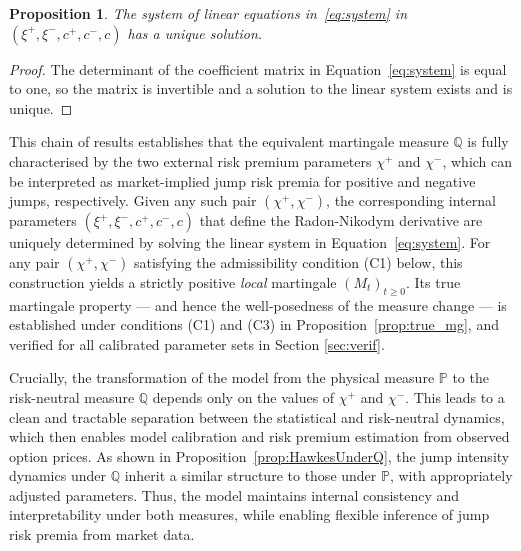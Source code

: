 \documentclass[11pt,a4paper]{article}
\numberwithin{equation}{section}
\newtheorem{proposition}[theorem]{Proposition}
\theoremstyle{remark}
\theoremstyle{definition}
\begin{document}
\begin{proposition}\label{lemma:solution}
    The system of linear equations in~\eqref{eq:system} in $(\xi^+, \xi^-, c^+, c^-, c)$ has a unique solution.
\end{proposition}
\begin{proof}
The determinant of the coefficient matrix in Equation~\eqref{eq:system} is equal to one, so the matrix is invertible and a solution to the linear system exists and is unique.
\end{proof}

This chain of results establishes that the equivalent martingale
measure $\mathbb{Q}$ is fully characterised by the two external risk
premium parameters $\chi^+$ and $\chi^-$, which can be interpreted as
market-implied jump risk premia for positive and negative jumps,
respectively. Given any such pair $(\chi^+, \chi^-)$, the
corresponding internal parameters $(\xi^+, \xi^-, c^+, c^-, c)$ that
define the Radon-Nikodym derivative are uniquely determined by solving
the linear system in Equation~\eqref{eq:system}. For any pair
  $(\chi^{+},\chi^{-})$ satisfying the
  admissibility condition (C1) below, this construction yields a
  strictly positive \emph{local} martingale $(M_t)_{t\ge0}$. Its true
  martingale property --- and hence the well-posedness of the measure
  change --- is established under conditions (C1) and (C3) in
  Proposition~\ref{prop:true_mg}, and verified for all calibrated
  parameter sets in Section \ref{sec:verif}.

Crucially, the transformation of the model from the physical measure $\mathbb{P}$ to the risk-neutral measure $\mathbb{Q}$ depends only on the values of $\chi^+$ and $\chi^-$. This leads to a clean and tractable separation between the statistical and risk-neutral dynamics, which then enables model calibration and risk premium estimation from observed option prices. As shown in Proposition~\ref{prop:HawkesUnderQ}, the jump intensity dynamics under $\mathbb{Q}$ inherit a similar structure to those under $\mathbb{P}$, with appropriately adjusted parameters. Thus, the model maintains internal consistency and interpretability under both measures, while enabling flexible inference of jump risk premia from market data.
\end{document}
